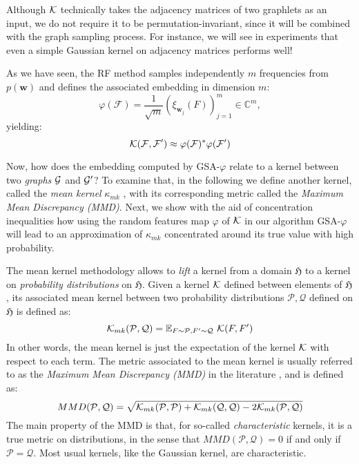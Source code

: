 Although $\mathcal{K}$ technically takes the adjacency matrices of two graphlets as an input, we do not require it to be permutation-invariant, since it will be combined with the graph sampling process.  For instance, we will see in experiments that even a simple Gaussian kernel on adjacency matrices performs well!

As we have seen, the RF method samples independently $m$ frequencies from $p(\mathbf{w})$ and defines the associated embedding in dimension $m$:
\begin{equation}\label{eq:RF}
\varphi(\mathcal{F}) = \frac{1}{\sqrt{m}} ( \xi_{\mathbf{w}_j}(F) )_{j=1}^m \in \mathbb{C}^m,
\end{equation}
yielding:
\[
\mathcal{K}(\mathcal{F},\mathcal{F}')\approx \varphi(\mathcal{F})^*\varphi(\mathcal{F}')
\]

Now, how does the embedding computed by GSA-$\varphi$ relate to a kernel between two \emph{graphs} $\mathcal{G}$ and $\mathcal{G}'$? To examine that, in the following we define another kernel, called the \emph{mean kernel} $\kappa_{mk}$ \citep{gretton}, with its corresponding metric called the \emph{Maximum Mean Discrepancy (MMD)}. Next, we show with the aid of concentration inequalities how using the random features map $\varphi$ of $\mathcal{K}$ in our algorithm GSA-$\varphi$ will lead to an approximation of $\kappa_{mk}$ concentrated around its true value with high probability.

The mean kernel methodology allows to \emph{lift} a kernel from a domain $\mathfrak{H}$ to a kernel on \emph{probability distributions} on $\mathfrak{H}$. Given a kernel $\mathcal{K}$ defined between elements of  $\mathfrak{H}$, its associated mean kernel between two probability distributions $\mathcal{P},\mathcal{Q}$ defined on $\mathfrak{H}$ is defined as:
\begin{equation}
\label{eq:mean_kernel}
\mathcal{K}_{mk}(\mathcal{P},\mathcal{Q}) = \mathbb{E}_{F \sim \mathcal{P}, F' \sim \mathcal{Q}}~ \mathcal{K}(F,F')
\end{equation}
In other words, the mean kernel is just the expectation of the kernel $\mathcal{K}$ with respect to each term. The metric associated to the mean kernel is usually referred to as the \emph{Maximum Mean Discrepancy (MMD)} in the literature \citep{gretton}, and is defined as:
\begin{equation}\label{eq:MMD}
MMD(\mathcal{P},\mathcal{Q}) = \sqrt{\mathcal{K}_{mk}(\mathcal{P},\mathcal{P}) + \mathcal{K}_{mk}(\mathcal{Q},\mathcal{Q}) - 2\mathcal{K}_{mk}(\mathcal{P},\mathcal{Q})}
\end{equation}
The main property of the MMD is that, for so-called \emph{characteristic} kernels, it is a true metric on distributions, in the sense that $MMD(\mathcal{P}, \mathcal{Q}) = 0$ if and only if $\mathcal{P} = \mathcal{Q}$. Most usual kernels, like the Gaussian kernel, are characteristic.

